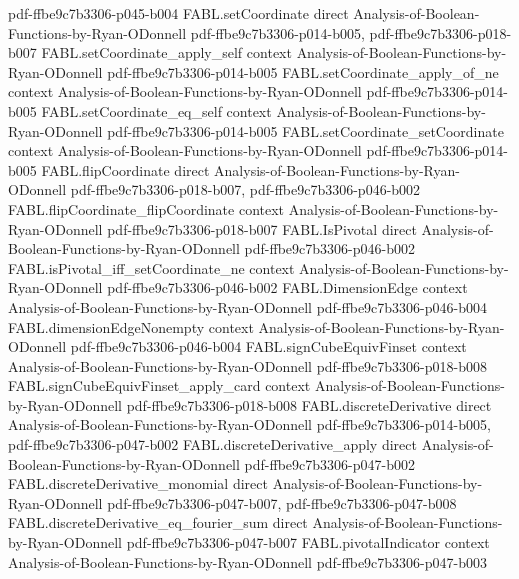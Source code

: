 \begin{theorem}
  {pdf-ffbe9c7b3306-p045-b004}
\proofstep
  {FABL.setCoordinate}
  {direct}
  {Analysis-of-Boolean-Functions-by-Ryan-ODonnell}
  {pdf-ffbe9c7b3306-p014-b005,
    pdf-ffbe9c7b3306-p018-b007}
\proofstep
  {FABL.setCoordinate_apply_self}
  {context}
  {Analysis-of-Boolean-Functions-by-Ryan-ODonnell}
  {pdf-ffbe9c7b3306-p014-b005}
\proofstep
  {FABL.setCoordinate_apply_of_ne}
  {context}
  {Analysis-of-Boolean-Functions-by-Ryan-ODonnell}
  {pdf-ffbe9c7b3306-p014-b005}
\proofstep
  {FABL.setCoordinate_eq_self}
  {context}
  {Analysis-of-Boolean-Functions-by-Ryan-ODonnell}
  {pdf-ffbe9c7b3306-p014-b005}
\proofstep
  {FABL.setCoordinate_setCoordinate}
  {context}
  {Analysis-of-Boolean-Functions-by-Ryan-ODonnell}
  {pdf-ffbe9c7b3306-p014-b005}
\proofstep
  {FABL.flipCoordinate}
  {direct}
  {Analysis-of-Boolean-Functions-by-Ryan-ODonnell}
  {pdf-ffbe9c7b3306-p018-b007,
    pdf-ffbe9c7b3306-p046-b002}
\proofstep
  {FABL.flipCoordinate_flipCoordinate}
  {context}
  {Analysis-of-Boolean-Functions-by-Ryan-ODonnell}
  {pdf-ffbe9c7b3306-p018-b007}
\proofstep
  {FABL.IsPivotal}
  {direct}
  {Analysis-of-Boolean-Functions-by-Ryan-ODonnell}
  {pdf-ffbe9c7b3306-p046-b002}
\proofstep
  {FABL.isPivotal_iff_setCoordinate_ne}
  {context}
  {Analysis-of-Boolean-Functions-by-Ryan-ODonnell}
  {pdf-ffbe9c7b3306-p046-b002}
\proofstep
  {FABL.DimensionEdge}
  {context}
  {Analysis-of-Boolean-Functions-by-Ryan-ODonnell}
  {pdf-ffbe9c7b3306-p046-b004}
\proofstep
  {FABL.dimensionEdgeNonempty}
  {context}
  {Analysis-of-Boolean-Functions-by-Ryan-ODonnell}
  {pdf-ffbe9c7b3306-p046-b004}
\proofstep
  {FABL.signCubeEquivFinset}
  {context}
  {Analysis-of-Boolean-Functions-by-Ryan-ODonnell}
  {pdf-ffbe9c7b3306-p018-b008}
\proofstep
  {FABL.signCubeEquivFinset_apply_card}
  {context}
  {Analysis-of-Boolean-Functions-by-Ryan-ODonnell}
  {pdf-ffbe9c7b3306-p018-b008}
\proofstep
  {FABL.discreteDerivative}
  {direct}
  {Analysis-of-Boolean-Functions-by-Ryan-ODonnell}
  {pdf-ffbe9c7b3306-p014-b005,
    pdf-ffbe9c7b3306-p047-b002}
\proofstep
  {FABL.discreteDerivative_apply}
  {direct}
  {Analysis-of-Boolean-Functions-by-Ryan-ODonnell}
  {pdf-ffbe9c7b3306-p047-b002}
\proofstep
  {FABL.discreteDerivative_monomial}
  {direct}
  {Analysis-of-Boolean-Functions-by-Ryan-ODonnell}
  {pdf-ffbe9c7b3306-p047-b007,
    pdf-ffbe9c7b3306-p047-b008}
\proofstep
  {FABL.discreteDerivative_eq_fourier_sum}
  {direct}
  {Analysis-of-Boolean-Functions-by-Ryan-ODonnell}
  {pdf-ffbe9c7b3306-p047-b007}
\proofstep
  {FABL.pivotalIndicator}
  {context}
  {Analysis-of-Boolean-Functions-by-Ryan-ODonnell}
  {pdf-ffbe9c7b3306-p047-b003}

\end{theorem}
